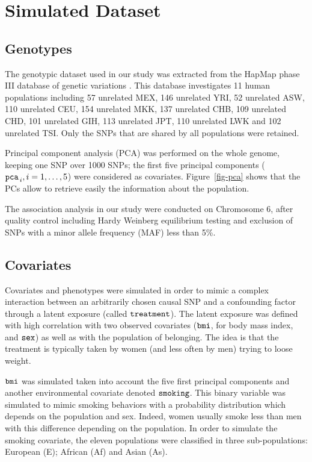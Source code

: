 \documentclass[10pt,a4paper]{article}
\begin{document}
\section{Simulated Dataset}

\subsection{Genotypes}
The genotypic dataset used in our study was extracted from the HapMap phase III database of genetic variations \citep{gibbs2003international}.  This database investigates 11 human populations including 57 unrelated MEX, 146 unrelated YRI, 52 unrelated ASW, 110 unrelated CEU, 154 unrelated MKK, 137 unrelated CHB, 109 unrelated CHD, 101 unrelated GIH, 113 unrelated JPT, 110 unrelated LWK and 102 unrelated TSI. Only the SNPs that are shared by all populations were retained. 

Principal component analysis (PCA) was performed on the whole genome, keeping one SNP over 1000 SNPs; the first five principal components (${\tt pca}_{\,i}, i=1,\ldots,5$) were considered as covariates. Figure~\ref{fig-pca} shows that the PCs allow to retrieve easily the information about the population. 

The association analysis in our study were conducted on Chromosome 6, after quality control including Hardy Weinberg equilibrium testing and exclusion of SNPs with a minor allele frequency (MAF) less than 5\%.

\subsection{Covariates}

Covariates and phenotypes were simulated in order to mimic a complex interaction between an arbitrarily chosen causal SNP and a confounding factor through a latent exposure (called ${\tt treatment}$). The latent exposure was defined with high correlation with two observed covariates (${\tt bmi}$, for body mass index, and ${\tt sex}$) as well as with the population of belonging. The idea is that the treatment is typically taken by women (and less often by men) trying to loose weight. 

$\tt{bmi}$ was simulated taken into account the five first principal components and another environmental covariate denoted ${\tt smoking}$. This binary variable was simulated to mimic smoking behaviors with a probability distribution which depends on the population and sex. Indeed, women usually smoke less than men with this difference depending on the population. In order to simulate the smoking covariate, the eleven populations were classified in three sub-populations: European (E); African (Af) and Asian (As). 
\end{document}
